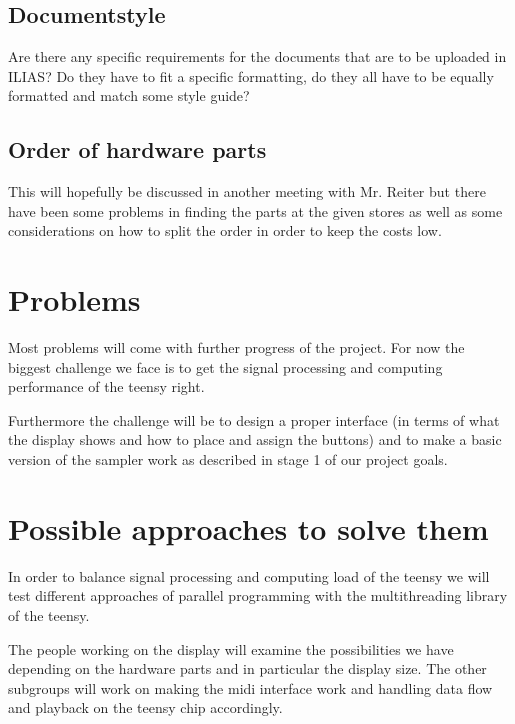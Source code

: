 \subsection{Documentstyle}
Are there any specific requirements for the documents that are to be uploaded in ILIAS? Do they have to fit a specific formatting, do they all have to be equally formatted and match some style guide?

\subsection{Order of hardware parts}
This will hopefully be discussed in another meeting with Mr. Reiter but there have been some problems in finding the parts at the given stores as well as some considerations on how to split the order in order to keep the costs low.

\section{Problems}
Most problems will come with further progress of the project. For now the biggest challenge we face is to get the signal processing and computing performance of the teensy right. 

Furthermore the challenge will be to design a proper interface (in terms of what the display shows and how to place and assign the buttons) and to make a basic version of the sampler work as described in stage 1 of our project goals.

\section{Possible approaches to solve them}
In order to balance signal processing and computing load of the teensy we will test different approaches of parallel programming with the multithreading library of the teensy.

The people working on the display will examine the possibilities we have depending on the hardware parts and in particular the display size. The other subgroups will work on making the midi interface work and handling data flow and playback on the teensy chip accordingly.


